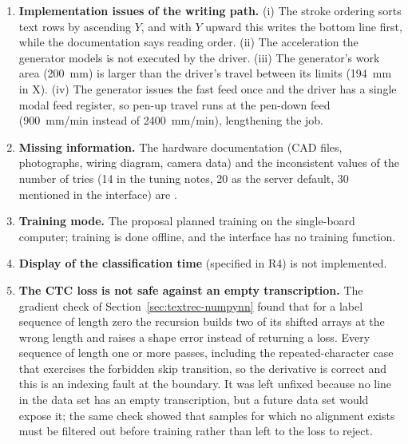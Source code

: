 \begin{enumerate}
          \item \textbf{Implementation issues of the writing path.} (i) The stroke ordering sorts text rows by ascending $Y$, and with $Y$ upward this writes the bottom line first, while the documentation says reading order. (ii) The acceleration the generator models is not executed by the driver. (iii) The generator's work area (200~mm) is larger than the driver's travel between its limits (194~mm in X). (iv) The generator issues the fast feed once and the driver has a single modal feed register, so pen-up travel runs at the pen-down feed (900~mm/min instead of 2400~mm/min), lengthening the job.
          \item \textbf{Missing information.} The hardware documentation (CAD files, photographs, wiring diagram, camera data) and the inconsistent values of the number of tries (14 in the tuning notes, 20 as the server default, 30 mentioned in the interface) are .
          \item \textbf{Training mode.} The proposal planned training on the single-board computer; training is done offline, and the interface has no training function.
          \item \textbf{Display of the classification time} (specified in R4) is not implemented.
          \item \textbf{The CTC loss is not safe against an empty transcription.} The gradient check of Section~\ref{sec:textrec-numpynn} found that for a label sequence of length zero the recursion builds two of its shifted arrays at the wrong length and raises a shape error instead of returning a loss.
          Every sequence of length one or more passes, including the repeated-character case that exercises the forbidden skip transition, so the derivative is correct and this is an indexing fault at the boundary.
          It was left unfixed because no line in the data set has an empty transcription, but a future data set would expose it; the same check showed that samples for which no alignment exists must be filtered out before training rather than left to the loss to reject.
        \end{enumerate}

